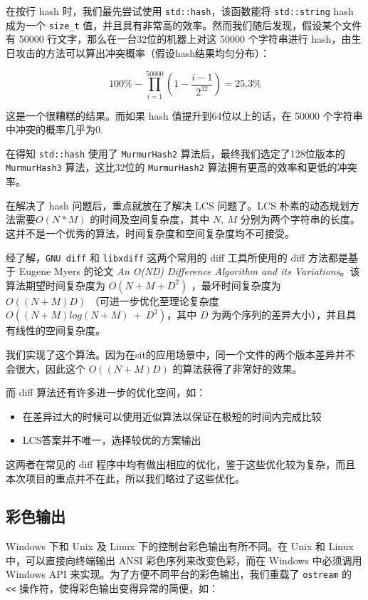 在按行 hash 时，我们最先尝试使用 \texttt{std::hash}，该函数能将
\texttt{std::string} hash 成为一个 \texttt{size\_t}
值，并且具有非常高的效率。然而我们随后发现，假设某个文件有 50000
行文字，那么在一台32位的机器上对这 50000 个字符串进行
hash，由生日攻击的方法可以算出冲突概率（假设hash结果均匀分布）：

\[
100\%-\prod _{i=1}^{50000} \left(1-\frac{i-1}{2^{32}}\right) = 25.3 \%
\]

这是一个很糟糕的结果。而如果 hash 值提升到64位以上的话，在 50000
个字符串中冲突的概率几乎为0.

在得知 \texttt{std::hash} 使用了 \texttt{MurmurHash2}
算法后，最终我们选定了128位版本的 \texttt{MurmurHash3} 算法，这比32位的
\texttt{MurmurHash2} 算法拥有更高的效率和更低的冲突率。

在解决了 hash 问题后，重点就放在了解决 LCS 问题了。LCS
朴素的动态规划方法需要$O(N*M)$ 的时间及空间复杂度，其中
$N,\ M$
分别为两个字符串的长度。这并不是一个优秀的算法，时间复杂度和空间复杂度均不可接受。

经了解，\texttt{GNU\ diff} 和 \texttt{libxdiff} 这两个常用的 diff
工具所使用的 diff 方法都是基于 Eugene Myers 的论文 \emph{An O(ND)
Difference Algorithm and its Variations}。该算法期望时间复杂度为
$O(N+M+D^2)$ ，最坏时间复杂度为 $O((N+M)D)$
（可进一步优化至理论复杂度 $O((N+M)log(N+M)\ +\ D^2)$，其中
$D$ 为两个序列的差异大小），并且具有线性的空间复杂度。

我们实现了这个算法。因为在sit的应用场景中，同一个文件的两个版本差异并不会很大，因此这个
$O((N+M)D)$ 的算法获得了非常好的效果。

而 diff 算法还有许多进一步的优化空间，如：

\begin{itemize}
\item
  在差异过大的时候可以使用近似算法以保证在极短的时间内完成比较
\item
  LCS答案并不唯一，选择较优的方案输出
\end{itemize}

这两者在常见的 diff
程序中均有做出相应的优化，鉴于这些优化较为复杂，而且本次项目的重点并不在此，所以我们略过了这些优化。

\subsection{彩色输出}

Windows 下和 Unix 及 Linux 下的控制台彩色输出有所不同。在 Unix 和 Linux
中，可以直接向终端输出 ANSI 彩色序列来改变色彩，而在 Windows 中必须调用
Windows API 来实现。为了方便不同平台的彩色输出，我们重载了
\texttt{ostream} 的 \texttt{\textless{}\textless{}}
操作符，使得彩色输出变得异常的简便，如：


